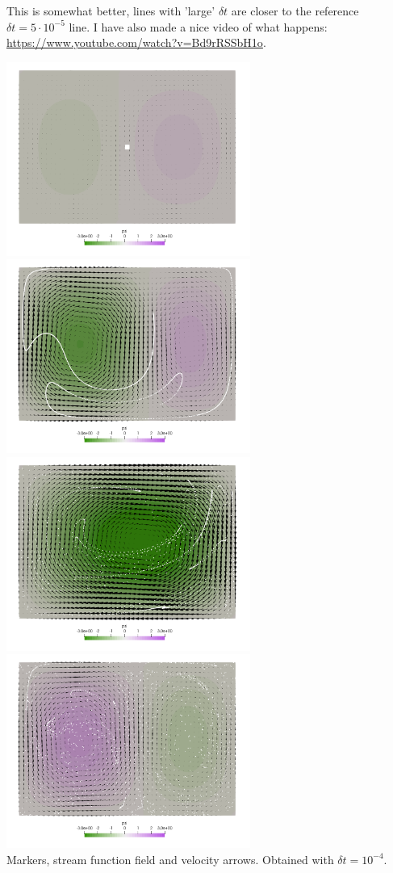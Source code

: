 This is somewhat better, lines with 'large' $\delta t$ are closer to the reference
$\delta t=5\cdot 10^{-5}$ line. 
I have also made a nice video of what happens:
\url{https://www.youtube.com/watch?v=Bd9rRSSbH1o}.

\begin{center}
\includegraphics[width=8cm]{python_codes/fieldstone_156/results/scheme2/psi0000}
\includegraphics[width=8cm]{python_codes/fieldstone_156/results/scheme2/psi0100}\\
\includegraphics[width=8cm]{python_codes/fieldstone_156/results/scheme2/psi0200}
\includegraphics[width=8cm]{python_codes/fieldstone_156/results/scheme2/psi0300}\\
{\captionfont Markers, stream function field and velocity arrows. Obtained with $\delta t=10^{-4}$.}
\end{center}


